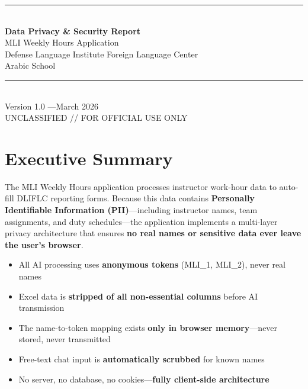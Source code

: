 \documentclass[11pt,letterpaper]{article}
\begin{document}
\begin{center}
  {\color{milgreen}\rule{\textwidth}{2pt}}\\[12pt]
  {\Huge\bfseries\color{milgreen} Data Privacy \& Security Report}\\[8pt]
  {\Large MLI Weekly Hours Application}\\[6pt]
  {\large Defense Language Institute Foreign Language Center}\\
  {\large Arabic School}\\[8pt]
  {\color{milgreen}\rule{\textwidth}{2pt}}\\[10pt]
  {\large Version 1.0 \quad---\quad March 2026}\\[4pt]
  {\small UNCLASSIFIED // FOR OFFICIAL USE ONLY}
\end{center}

\vspace{16pt}

\section{Executive Summary}

The MLI Weekly Hours application processes instructor work-hour data to auto-fill DLIFLC reporting forms. Because this data contains \textbf{Personally Identifiable Information (PII)}---including instructor names, team assignments, and duty schedules---the application implements a multi-layer privacy architecture that ensures \textbf{no real names or sensitive data ever leave the user's browser}.

\begin{tcolorbox}[safestyle, title={Bottom Line Up Front}]
\begin{itemize}[nosep,leftmargin=*]
  \item All AI processing uses \textbf{anonymous tokens} (MLI\_1, MLI\_2), never real names
  \item Excel data is \textbf{stripped of all non-essential columns} before AI transmission
  \item The name-to-token mapping exists \textbf{only in browser memory}---never stored, never transmitted
  \item Free-text chat input is \textbf{automatically scrubbed} for known names
  \item No server, no database, no cookies---\textbf{fully client-side architecture}
\end{itemize}
\end{tcolorbox}
\end{document}
